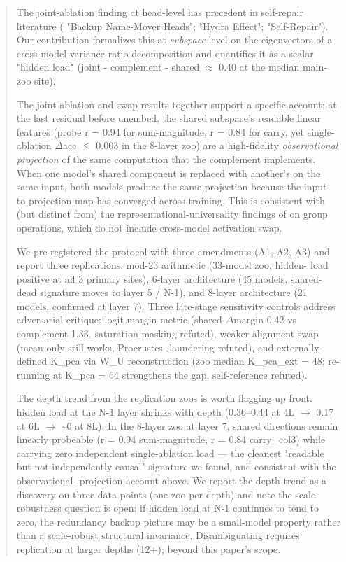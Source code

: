 \begin{abstract}
The joint-ablation finding at head-level has precedent in self-repair
literature (\citet{wang2023iw} "Backup Name-Mover Heads"; \citet{mcgrath2023hydra} "Hydra Effect"; \citet{rushing2024selfrepair} "Self-Repair"). Our
contribution formalizes this at \emph{subspace} level on the eigenvectors of
a cross-model variance-ratio decomposition and quantifies it as a
scalar "hidden load" (joint - complement - shared $\approx$ 0.40 at the
median main-zoo site).

The joint-ablation and swap results together support a specific
account: at the last residual before unembed, the shared subspace's
readable linear features (probe r = 0.94 for sum-magnitude, r = 0.84
for carry, yet single-ablation $\Delta$acc $\leq$ 0.003 in the 8-layer zoo) are a
high-fidelity \emph{observational projection} of the same computation that
the complement implements. When one model's shared component is
replaced with another's on the same input, both models produce the
same projection because the input-to-projection map has converged
across training. This is consistent with (but distinct from) the
representational-universality findings of \citet{chughtai2023universality}
on group operations, which do not include cross-model activation swap.

We pre-registered the protocol with three amendments (A1, A2, A3) and
report three replications: mod-23 arithmetic (33-model zoo, hidden-
load positive at all 3 primary sites), 6-layer architecture (45
models, shared-dead signature moves to layer 5 / N-1), and 8-layer
architecture (21 models, confirmed at layer 7). Three late-stage
sensitivity controls address adversarial critique: logit-margin
metric (shared $\Delta$margin 0.42 vs complement 1.33, saturation masking
refuted), weaker-alignment swap (mean-only still works, Procrustes-
laundering refuted), and externally-defined K\_pca via W\_U
reconstruction (zoo median K\_pca\_ext = 48; re-running at K\_pca = 64
strengthens the gap, self-reference refuted).

The depth trend from the replication zoos is worth flagging up
front: hidden load at the N-1 layer shrinks with depth (0.36--0.44 at
4L $\to$ 0.17 at 6L $\to$ \textasciitilde{}0 at 8L). In the 8-layer zoo at layer 7, shared
directions remain linearly probeable (r = 0.94 sum-magnitude, r =
0.84 carry\_col3) while carrying zero independent single-ablation
load --- the cleanest "readable but not independently causal"
signature we found, and consistent with the observational-
projection account above. We report the depth trend as a discovery
on three data points (one zoo per depth) and note the scale-
robustness question is open: if hidden load at N-1 continues to
tend to zero, the redundancy backup picture may be a small-model
property rather than a scale-robust structural invariance.
Disambiguating requires replication at larger depths (12+); beyond
this paper's scope.

\end{abstract}

